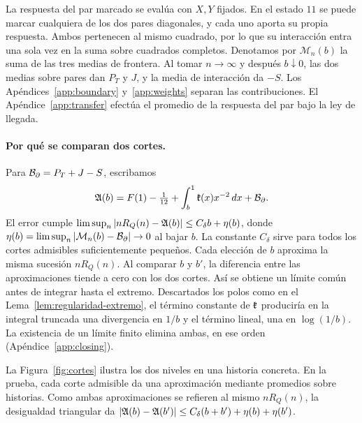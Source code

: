 La respuesta del par marcado se evalúa con \(X,Y\) fijados. En el estado \(11\) se puede
marcar cualquiera de los dos pares diagonales, y cada uno aporta su propia respuesta. Ambos
pertenecen al mismo cuadrado, por lo que su interacción entra una sola vez en la suma sobre
cuadrados completos. Denotamos por \(\mathcal M_n(b)\) la suma de las tres medias de frontera.
Al tomar \(n\to\infty\) y después \(b\downarrow0\), las dos medias sobre pares dan \(P_T\)
y \(J\), y la media de interacción da \(-S\). Los Apéndices~\ref{app:boundary}
y~\ref{app:weights} separan las contribuciones. El Apéndice~\ref{app:transfer}
efectúa el promedio de la respuesta del par bajo la ley de llegada.

\paragraph{Por qué se comparan dos cortes.}
Para \(\mathcal B_{\partial}=P_T+J-S\), escribamos
\[
 \mathfrak A(b)=F(1)-\tfrac1{12}+\int_b^1 \mathfrak{k}(x)x^{-2}\,dx+\mathcal B_{\partial}.
\]
El error cumple \(\limsup_n |nR_Q(n)-\mathfrak A(b)|\le C_\delta b+\eta(b)\), donde
\(\eta(b)=\limsup_n|\mathcal M_n(b)-\mathcal B_{\partial}|\to0\) al bajar \(b\). La constante \(C_\delta\)
sirve para todos los cortes admisibles suficientemente pequeños. Cada elección de \(b\) aproxima
la misma sucesión \(nR_Q(n)\). Al comparar \(b\) y \(b'\), la diferencia entre las aproximaciones
tiende a cero con los dos cortes. Así se obtiene un límite común antes de integrar hasta el
extremo. Descartados los polos como en el Lema~\ref{lem:regularidad-extremo}, el término
constante de \(\mathfrak{k}\) produciría en la integral truncada una divergencia en
\(1/b\) y el término lineal, una en \(\log(1/b)\). La existencia de un límite finito elimina
ambas, en ese orden (Apéndice~\ref{app:closing}).

La Figura~\ref{fig:cortes} ilustra los dos niveles en una historia concreta. En la prueba,
cada corte admisible da una aproximación mediante promedios sobre historias. Como ambas
aproximaciones se refieren al mismo \(nR_Q(n)\), la desigualdad triangular da
\(\lvert\mathfrak A(b)-\mathfrak A(b')\rvert\le C_\delta(b+b')+\eta(b)+\eta(b')\).


